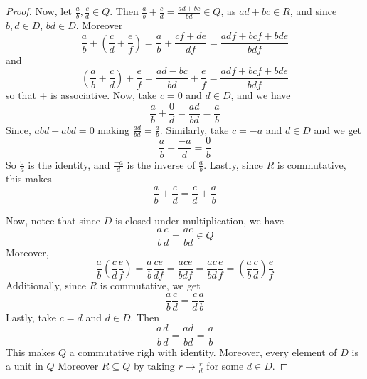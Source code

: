 \begin{proof}
  Now, let  $\frac{a}{b},\frac{c}{d} \in Q$. Then
  $\frac{a}{b}+\frac{c}{d}=\frac{ad+bc}{bd} \in Q$, as $ad+bc \in R$, and
  since  $b,d \in D$,  $bd \in D$. Moreover
  \begin{equation*}
    \frac{a}{b}+(\frac{c}{d}+\frac{e}{f})=\frac{a}{b}+\frac{cf+de}{df}
    =\frac{adf+bcf+bde}{bdf}
  \end{equation*}
  and
  \begin{equation*}
    (\frac{a}{b}+\frac{c}{d})+\frac{e}{f}=\frac{ad-bc}{bd}+\frac{e}{f}
    =\frac{adf+bcf+bde}{bdf}
  \end{equation*}
  so that $+$ is associative. Now, take  $c=0$ and  $d \in D$, and we have
  \begin{equation*}
    \frac{a}{b}+\frac{0}{d}=\frac{ad}{bd}=\frac{a}{b}
  \end{equation*}
  Since, $abd-abd=0$ making $\frac{ad}{bd}=\frac{a}{b}$. Similarly, take
  $c=-a$ and  $d \in D$ and we get
  \begin{equation*}
    \frac{a}{b}+\frac{-a}{d}=\frac{0}{b}
  \end{equation*}
  So $\frac{0}{d}$ is the identity, and $\frac{-a}{d}$ is the inverse of
  $\frac{a}{b}$. Lastly, since $R$ is commutative, this makes
  \begin{equation*}
    \frac{a}{b}+\frac{c}{d}=\frac{c}{d}+\frac{a}{b}
  \end{equation*}

  Now, notce that since $D$ is closed under multiplication, we have
  \begin{equation*}
    \frac{a}{b}\frac{c}{d}=\frac{ac}{bd} \in Q
  \end{equation*}
  Moreover,
  \begin{equation*}
    \frac{a}{b}(\frac{c}{d}\frac{e}{f})=\frac{a}{b}\frac{ce}{df}=\frac{ace}{bdf}
    =\frac{ac}{bd}\frac{e}{f}=(\frac{a}{b}\frac{c}{d})\frac{e}{f}
  \end{equation*}
  Additionally, since $R$ is commutative, we get
  \begin{equation*}
    \frac{a}{b}\frac{c}{d}=\frac{c}{d}\frac{a}{b}
  \end{equation*}
  Lastly, take $c=d$ and  $d \in D$. Then
  \begin{equation*}
    \frac{a}{b}\frac{d}{d}=\frac{ad}{bd}=\frac{a}{b}
  \end{equation*}
  This makes $Q$ a commutative righ with identity. Moreover, every element of
  $D$ is a unit in $Q$ Moreover $R \subseteq Q$ by taking $r \xrightarrow{}
  \frac{r}{d}$ for some $d \in D$.
\end{proof}
